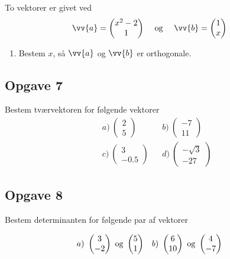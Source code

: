 To vektorer er givet ved
\begin{align*}
	&\vv{a} = 
	\begin{pmatrix}
		x^2 - 2 \\
		1	
	\end{pmatrix}& 
	&\textnormal{ og } &
	&\vv{b} = 
	\begin{pmatrix}
		1 \\
		x
	\end{pmatrix}
\end{align*}
\begin{enumerate}[label = \roman*)]
	\item Bestem $x$, så $\vv{a}$ og $\vv{b}$ er orthogonale.
\end{enumerate}

\newpage
\subsection*{Opgave 7}

Bestem tværvektoren for følgende vektorer 
\begin{align*}
	&a) \ 
	\begin{pmatrix}
		2 \\ 5
	\end{pmatrix}		
	&
    &b) \ 
    \begin{pmatrix}
    		-7 \\ 11
    \end{pmatrix}   \\
    &c) \
    \begin{pmatrix}
    		3 \\ -0.5
    \end{pmatrix}
    &
    &d) \
    \begin{pmatrix}
    		-\sqrt{3} \\ -27
    \end{pmatrix}
\end{align*}

\subsection*{Opgave 8}

Bestem determinanten for følgende par af vektorer

\begin{align*}
	&a) \	
	\begin{pmatrix}
		3 \\ -2
	\end{pmatrix}
	\textnormal{ og }
	\begin{pmatrix}
		5 \\ 1
	\end{pmatrix}
	&
	&b) \ 
	\begin{pmatrix}
		6 \\ 10
	\end{pmatrix}
	\textnormal{ og }
	\begin{pmatrix}
		4 \\ -7
	\end{pmatrix}
\end{align*}

